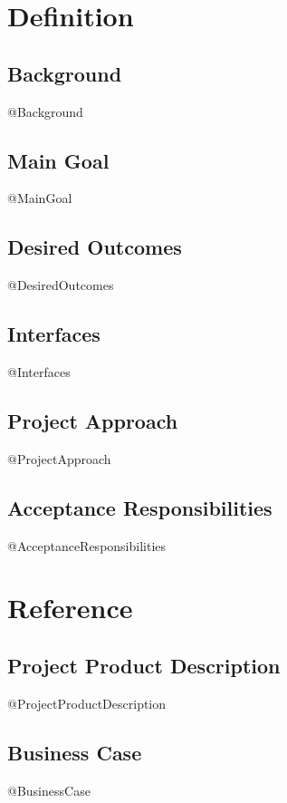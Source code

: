 \documentclass{report}
\begin{document}
\date{\today}
\author{@Author}

\maketitle

\tableofcontents

\newpage

\chapter{Definition}
\section{Background}
@Background

\section{Main Goal}
@MainGoal

\section{Desired Outcomes}
@DesiredOutcomes

\section{Interfaces}
@Interfaces

\section{Project Approach}
@ProjectApproach

\section{Acceptance Responsibilities}
@AcceptanceResponsibilities

\chapter{Reference}
\section{Project Product Description}
@ProjectProductDescription

\section{Business Case}
@BusinessCase
\end{document}
